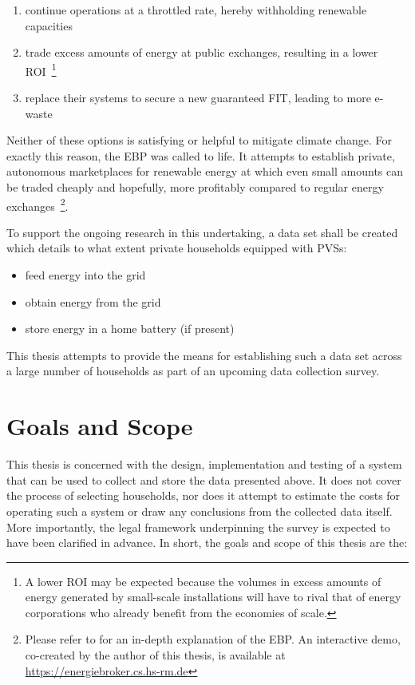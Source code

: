 \begin{enumerate}[label=(\Alph*)]
  \item continue operations at a throttled rate, hereby withholding renewable capacities
  \item trade excess amounts of energy at public exchanges, resulting in a lower \acs{ROI}~\footnote{A lower \acs{ROI} may be expected because the volumes in excess amounts of energy generated by small-scale installations will have to rival that of energy corporations who already benefit from the economies of scale.}
  \item replace their systems to secure a new guaranteed \ac{FIT}, leading to more e-waste
\end{enumerate}

Neither of these options is satisfying or helpful to mitigate climate change. For exactly this reason, the \ac{EBP} was called to life. It attempts to establish private, autonomous marketplaces for renewable energy at which even small amounts can be traded cheaply and hopefully, more profitably compared to regular energy exchanges~\footnote{Please refer to \cite{stoy2019broker} for an in-depth explanation of the \ac{EBP}. An interactive demo, co-created by the author of this thesis, is available at \url{https://energiebroker.cs.hs-rm.de}}.

To support the ongoing research in this undertaking, a data set shall be created which details to what extent private households equipped with \acsp{PVS}:

\begin{itemize}
  \item feed energy into the grid
  \item obtain energy from the grid
  \item store energy in a home battery (if present)
\end{itemize}

This thesis attempts to provide the means for establishing such a data set across a large number of households as part of an upcoming data collection survey.


\section{Goals and Scope}
\label{sec:goals-and-scope}

This thesis is concerned with the design, implementation and testing of a system that can be used to collect and store the data presented above. It does not cover the process of selecting households, nor does it attempt to estimate the costs for operating such a system or draw any conclusions from the collected data itself. More importantly, the legal framework underpinning the survey is expected to have been clarified in advance. In short, the goals and scope of this thesis are the:

